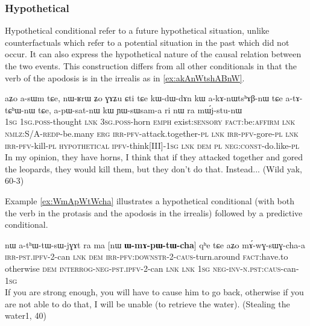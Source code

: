 \documentclass[oldfontcommands,oneside,a4paper,11pt]{article}
\newcommand{\ipa}[1]{{\phon \mbox{#1}}} %
\begin{document}
\subsubsection{Hypothetical}
Hypothetical conditional refer to a future hypothetical situation,   unlike counterfactuals which refer to a potential situation in the past which did not occur. It can also express the hypothetical nature of the causal relation between the two events. This construction differs from all other conditionals in that the verb of the apodosis is in the irrealis as in \ref{ex:akAnWtshABnW}.


\begin{exe}
\ex \label{ex:akAnWtshABnW}
\gll 
 \ipa{aʑo}  	\ipa{a-sɯm}  	\ipa{tɕe,}  	\ipa{nɯ-ʁrɯ}  	\ipa{ʑo}  	\ipa{ɣɤʑu}  	\ipa{ɕti}  	\ipa{tɕe}  \ipa{kɯ-dɯ-dɤn}  	\ipa{kɯ}  \ipa{a-kɤ-nɯtsʰɤβ-nɯ}  	\ipa{tɕe}  	\ipa{a-tɤ-tɕʰɯ-nɯ}  	\ipa{tɕe,}  \ipa{a-pɯ-sat-nɯ}  	\ipa{kɯ}  	\ipa{ɲɯ-sɯsam-a}  \ipa{ri} \ipa{nɯ} \ipa{ra}  	\ipa{mɯ́j-stu-nɯ}  \\
 \textsc{1sg} \textsc{1sg.poss}-thought \textsc{lnk} \textsc{3sg.poss}-horn \textsc{emph} exist:\textsc{sensory} \textsc{fact}:be:\textsc{affirm} \textsc{lnk} \textsc{nmlz}:S/A-\textsc{redp}-be.many \textsc{erg} \textsc{irr-pfv}-attack.together-\textsc{pl} \textsc{lnk}  \textsc{irr-pfv}-gore-\textsc{pl} \textsc{lnk}  \textsc{irr-pfv}-kill-\textsc{pl} \textsc{hypothetical} \textsc{ipfv}-think[III]-\textsc{1sg} \textsc{lnk} \textsc{dem} \textsc{pl} \textsc{neg:const}-do.like-\textsc{pl} \\
\glt In my opinion, they have horns, I think that if they attacked together and gored the leopards, they would kill them, but they don't do that. Instead... (Wild yak, 60-3)
\end{exe} 

Example  \ref{ex:WmApWtWcha} illustrates a hypothetical conditional  (with both the verb in the protasis and the apodosis in the irrealis) followed by a predictive conditional.

\begin{exe}
\ex \label{ex:WmApWtWcha}
\gll 
[\textbf{\ipa{a-pɯ-tɯ-cha}}]  	\ipa{nɤ,}  	\ipa{nɯ}  	\ipa{a-tʰɯ-tɯ-sɯ-jɣɤt}  	\ipa{ra}  	\ipa{ma}  	[\ipa{nɯ}  	\textbf{\ipa{ɯ-mɤ-pɯ-tɯ-cha}}]  	\ipa{qʰe}  	\ipa{tɕe}  	\ipa{aʑo}  	\ipa{mɤ́-wɣ-sɯɣ-cha-a}  	  \\
\textsc{irr-pst.ipfv-2}-can \textsc{lnk} \textsc{dem} \textsc{irr-pfv:downstr-2-caus}-turn.around \textsc{fact}:have.to otherwise
\textsc{dem}  \textsc{interrog-neg-pst.ipfv}-2-can \textsc{lnk} \textsc{lnk} \textsc{1sg} \textsc{neg-inv-n.pst:caus}-can-\textsc{1sg} \\
\glt If you are strong enough, you will have to cause him to go back, otherwise if you are not able to do that, I will be unable (to retrieve the water). (Stealing the water1, 40)
\end{exe} 
\end{document}
